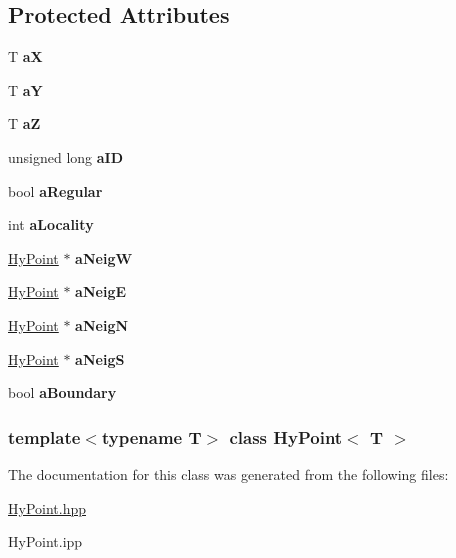 \subsection*{Protected Attributes}
\begin{DoxyCompactItemize}
\item 
\hypertarget{classHyPoint_a621a7b4dc8f10a4b3b3ba6889984f679}{
T {\bfseries aX}}
\label{classHyPoint_a621a7b4dc8f10a4b3b3ba6889984f679}

\item 
\hypertarget{classHyPoint_ad73bb2928402cf7b742f4112bf0ab027}{
T {\bfseries aY}}
\label{classHyPoint_ad73bb2928402cf7b742f4112bf0ab027}

\item 
\hypertarget{classHyPoint_a556c7c43914d1142d323a261e9b80991}{
T {\bfseries aZ}}
\label{classHyPoint_a556c7c43914d1142d323a261e9b80991}

\item 
\hypertarget{classHyPoint_a03b4fa88c8d1e26d334db8708c3e1ade}{
unsigned long {\bfseries aID}}
\label{classHyPoint_a03b4fa88c8d1e26d334db8708c3e1ade}

\item 
\hypertarget{classHyPoint_a970648d0e335272cb70496890d34f3d4}{
bool {\bfseries aRegular}}
\label{classHyPoint_a970648d0e335272cb70496890d34f3d4}

\item 
\hypertarget{classHyPoint_a0e40b31ce4bdea3dd2eb450245a532ae}{
int {\bfseries aLocality}}
\label{classHyPoint_a0e40b31ce4bdea3dd2eb450245a532ae}

\item 
\hypertarget{classHyPoint_aa7692363efc10f709cb7df258b8c1dde}{
\hyperlink{classHyPoint}{HyPoint} $\ast$ {\bfseries aNeigW}}
\label{classHyPoint_aa7692363efc10f709cb7df258b8c1dde}

\item 
\hypertarget{classHyPoint_ae4718bd52b919a1bff3496450ccc62ad}{
\hyperlink{classHyPoint}{HyPoint} $\ast$ {\bfseries aNeigE}}
\label{classHyPoint_ae4718bd52b919a1bff3496450ccc62ad}

\item 
\hypertarget{classHyPoint_a7e3d2c15bdace44908252b79be164925}{
\hyperlink{classHyPoint}{HyPoint} $\ast$ {\bfseries aNeigN}}
\label{classHyPoint_a7e3d2c15bdace44908252b79be164925}

\item 
\hypertarget{classHyPoint_a47aa9914ea1a270a4c8a74ca0f89a5b8}{
\hyperlink{classHyPoint}{HyPoint} $\ast$ {\bfseries aNeigS}}
\label{classHyPoint_a47aa9914ea1a270a4c8a74ca0f89a5b8}

\item 
\hypertarget{classHyPoint_adc04d93e4200154433e0bace08df3e8a}{
bool {\bfseries aBoundary}}
\label{classHyPoint_adc04d93e4200154433e0bace08df3e8a}

\end{DoxyCompactItemize}
\subsubsection*{template$<$typename T$>$ class HyPoint$<$ T $>$}



The documentation for this class was generated from the following files:\begin{DoxyCompactItemize}
\item 
\hyperlink{HyPoint_8hpp}{HyPoint.hpp}\item 
HyPoint.ipp\end{DoxyCompactItemize}
